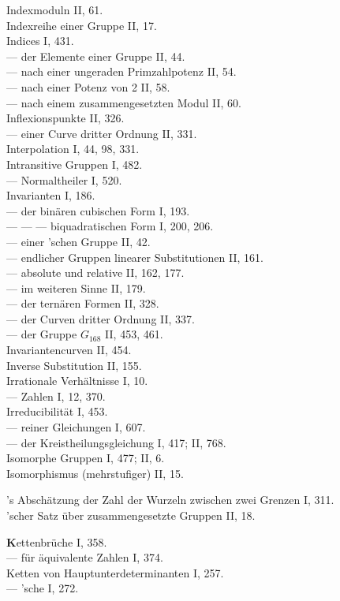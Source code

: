 Indexmoduln II, 61.\\
Indexreihe einer Gruppe II, 17.\\
Indices I, 431.\\
--- der Elemente einer Gruppe II, 44.\\
--- nach einer ungeraden Primzahlpotenz II, 54.\\
--- nach einer Potenz von 2 II, 58.\\
--- nach einem zusammengesetzten Modul II, 60.\\
Inflexionspunkte II, 326.\\
--- einer Curve dritter Ordnung II, 331.\\
Interpolation I, 44, 98, 331.\\
Intransitive Gruppen I, 482.\\
--- Normaltheiler I, 520.\\
Invarianten I, 186.\\
--- der binären cubischen Form I, 193.\\
--- --- --- biquadratischen Form I, 200, 206.\\
--- einer 'schen Gruppe II, 42.\\
--- endlicher Gruppen linearer Substitutionen II, 161.\\
--- absolute und relative II, 162, 177.\\
--- im weiteren Sinne II, 179.\\
--- der ternären Formen II, 328.\\
--- der Curven dritter Ordnung II, 337.\\
--- der Gruppe $G_{168}$ II, 453, 461.\\
Invariantencurven II, 454.\\
Inverse Substitution II, 155.\\
Irrationale Verhältnisse I, 10.\\
--- Zahlen I, 12, 370.\\
Irreducibilität I, 453.\\
--- reiner Gleichungen I, 607.\\
--- der Kreistheilungsgleichung I, 417; II, 768.\\
Isomorphe Gruppen I, 477; II, 6.\\
Isomorphismus (mehrstufiger) II, 15.

\medskip
\noindent
{}'s Abschätzung der Zahl der Wurzeln zwischen zwei Grenzen I, 311.\\
'scher Satz über zusammengesetzte Gruppen II, 18.

\medskip
\noindent
\textbf{K}ettenbrüche I, 358.\\
--- für äquivalente Zahlen I, 374.\\
Ketten von Hauptunterdeterminanten I, 257.\\
--- 'sche I, 272.
